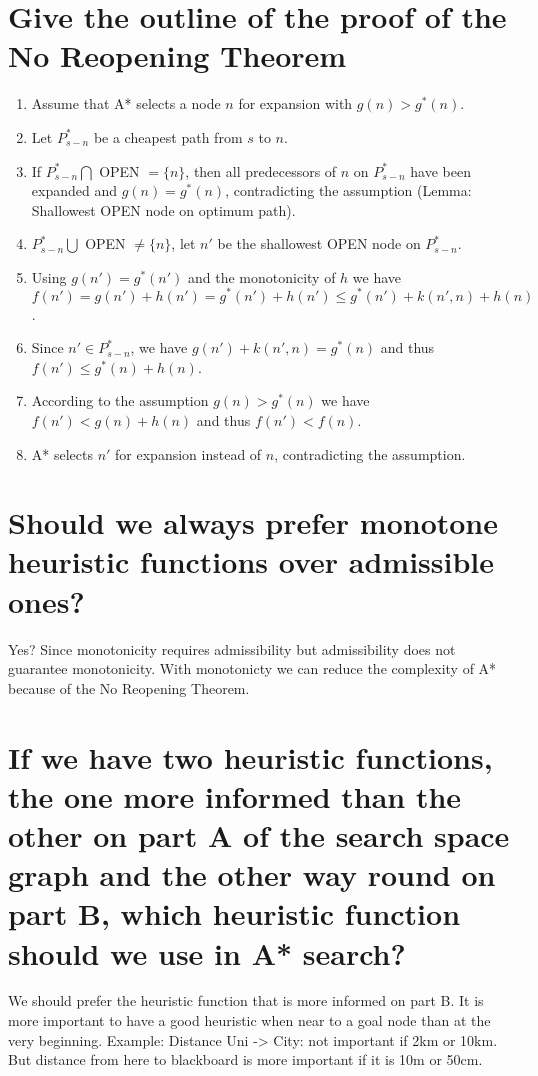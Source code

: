 \documentclass[12pt, a4paper]{article}
\begin{document}
\section{Give the outline of the proof of the No Reopening Theorem}
\begin{enumerate}
\item Assume that A* selects a node $n$ for expansion with $g(n) > g^*(n)$.
\item Let $P^*_{s-n}$ be a cheapest path from $s$ to $n$.
\item If $P^*_{s-n} \bigcap$ OPEN $ = \{n\}$, then all predecessors of $n$ on $P^*_{s-n}$ have been expanded and $g(n) = g^*(n)$, contradicting the assumption (Lemma: Shallowest OPEN node on optimum path).
\item $P^*_{s-n} \bigcup$ OPEN $ \neq \{n\}$, let $n'$ be the shallowest OPEN node on $P^*_{s-n}$.
\item Using $g(n') = g^*(n')$ and the monotonicity of $h$ we have $f(n') = g(n') + h(n') = g^*(n') + h(n') \leq g^*(n') + k(n', n) + h(n)$.
\item Since $n' \in P^*_{s-n}$, we have $g(n') + k(n', n) = g^*(n)$ and thus $f(n') \leq g^*(n) + h(n)$.
\item According to the assumption $g(n) > g^*(n)$ we have $f(n') < g(n) + h(n)$ and thus $f(n') < f(n)$.
\item A* selects $n'$ for expansion instead of $n$, contradicting the assumption. 
\end{enumerate}


\section{Should we always prefer monotone heuristic functions over admissible ones?}
Yes? Since monotonicity requires admissibility but admissibility does not guarantee monotonicity. With monotonicty we can reduce the complexity of A* because of the No Reopening Theorem.

\section{If we have two heuristic functions, the one more informed than the other on part A of the search
space graph and the other way round on part B, which heuristic function should we use in A* search?}

We should prefer the heuristic function that is more informed on part B. It is more important to have a good heuristic when near to a goal node than at the very beginning. Example: Distance Uni -> City: not important if 2km or 10km. But distance from here to blackboard is more important if it is 10m or 50cm. 
\end{document}
